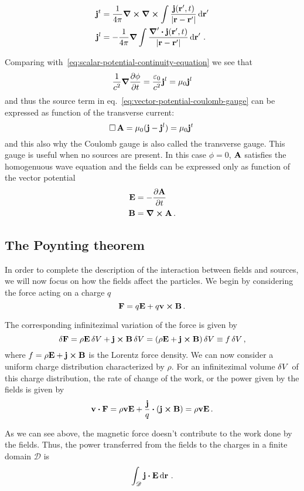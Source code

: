 \documentclass[class=report, crop=false]{standalone}
\begin{document}
\begin{align*}
  \vb{j}^t &= \frac{1}{4\pi} \curl \curl \int \frac{\vb{j}(\vb{r}',t)}{|\vb{r}-\vb{r}'|} \dd{\vb{r}}' \\
  \vb{j}^l &= -\frac{1}{4\pi} \grad \int
    \frac{\boldsymbol{\nabla}' \vdot \vb{j}(\vb{r}',t)}{|\vb{r}-\vb{r}'|} \dd{\vb{r}}'\,.
\end{align*}

Comparing with~\eqref{eq:scalar-potential-continuity-equation} we see that
\[
  \frac{1}{c^2} \grad{\pdv{\phi}{t}} = \frac{\varepsilon_0}{c^2} \vb{j}^l
  = \mu_0 \vb{j}^l
\]
and thus the source term in eq.~\eqref{eq:vector-potential-coulomb-gauge} can
be expressed as function of the transverse current:
\[
  \operatorname{\Box} \vb{A} = \mu_0 (\vb{j} - \vb{j}^l) = \mu_0 \vb{j}^t\,
\]
and this also why the Coulomb gauge is also called the transverse gauge.
This gauge is useful when no sources are present. In this case \(\phi=0\),
\(\vb{A}\) satisfies the homogenuous wave equation and the fields can
be expressed only as function of the vector potential
\begin{align*}
  \vb{E} &= -\pdv{\vb{A}}{t} \\
  \vb{B} &= \curl{\vb{A}}\,.
\end{align*}

\subsection{The Poynting theorem}

In order to complete the description of the interaction between fields
and sources, we will now focus on how the fields affect the particles.
We begin by considering the force acting on a charge \(q\)
\[
  \vb{F} = q\vb{E} + q\vb{v} \cp \vb{B}\,.
\]

The corresponding infinitezimal variation of the force is given by
\[
  \var{\vb{F}} = \rho \vb{E} \var{V} + \vb{j} \cp \vb{B} \var{V}
    = (\rho \vb{E} + \vb{j} \cp \vb{B}) \var{V}
    \equiv f \var{V},
\]
where \(f = \rho \vb{E} + \vb{j} \cp \vb{B}\) is the Lorentz force
density. We can now consider a uniform charge distribution characterized
by \(\rho\). For an infinitezimal volume \(\var{V}\) of this charge distribution,
the rate of change of the work, or the power given by the
fields is given by
\[
  \vb{v} \vdot \vb{F} = \rho \vb{v} \vb{E} + \frac{\vb{j}}{q} \vdot (\vb{j} \cp \vb{B})
    = \rho \vb{v} \vb{E}\,.
\]

As we can see above, the magnetic force doesn't contribute to the work
done by the fields. Thus, the power transferred from the fields to the
charges in a finite domain \(\mathscr{D}\) is
\[
  \int_{\mathscr{D}} \vb{j} \vdot \vb{E} \dd{\vb{r}}\,.
\]
\end{document}

